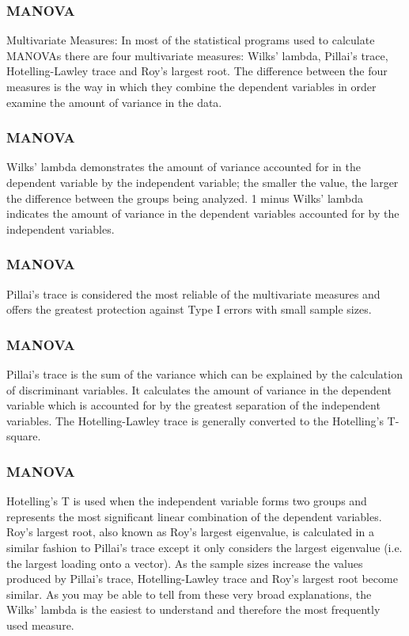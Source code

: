 \documentclass{beamer}
\begin{document}
	
	\begin{frame}
		\frametitle{MANOVA}
		Multivariate Measures: In most of the statistical programs used to calculate MANOVAs
		there are four multivariate measures: Wilks’ lambda, Pillai's trace, Hotelling-Lawley trace
		and Roy’s largest root. The difference between the four measures is the way in which
		they combine the dependent variables in order examine the amount of variance in the
		data. 
	\end{frame}
	\begin{frame}
		\frametitle{MANOVA}
		Wilks’ lambda demonstrates the amount of variance accounted for in the dependent
		variable by the independent variable; the smaller the value, the larger the difference
		between the groups being analyzed. 1 minus Wilks’ lambda indicates the amount of
		variance in the dependent variables accounted for by the independent variables.
	\end{frame}
	\begin{frame}
		\frametitle{MANOVA} Pillai's
		trace is considered the most reliable of the multivariate measures and offers the greatest
		protection against Type I errors with small sample sizes. 
	\end{frame}
	\begin{frame}
		\frametitle{MANOVA}
		Pillai's trace is the sum of the
		variance which can be explained by the calculation of discriminant variables. It calculates
		the amount of variance in the dependent variable which is accounted for by the greatest
		separation of the independent variables. The Hotelling-Lawley trace is generally 
				converted to the Hotelling’s T-square. 
	\end{frame}
	\begin{frame}
		\frametitle{MANOVA}
		Hotelling’s T is used when the independent
		variable forms two groups and represents the most significant linear combination of the
		dependent variables. Roy’s largest root, also known as Roy’s largest eigenvalue, is
		calculated in a similar fashion to Pillai's trace except it only considers the largest
		eigenvalue (i.e. the largest loading onto a vector). As the sample sizes increase the values
		produced by Pillai’s trace, Hotelling-Lawley trace and Roy’s largest root become similar.
		As you may be able to tell from these very broad explanations, the Wilks’ lambda is the
		easiest to understand and therefore the most frequently used measure.
	\end{frame}
\end{document}
